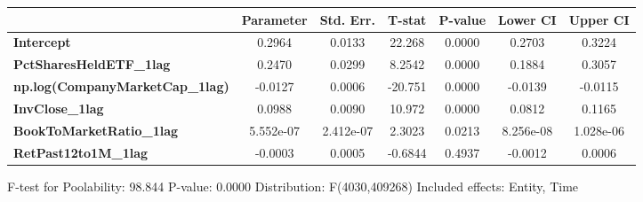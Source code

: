 \begin{center}
\begin{tabular}{lclc}
\bottomrule
\end{tabular}
\begin{tabular}{lcccccc}
                                        & \textbf{Parameter} & \textbf{Std. Err.} & \textbf{T-stat} & \textbf{P-value} & \textbf{Lower CI} & \textbf{Upper CI}  \\
\midrule
\textbf{Intercept}                      &       0.2964       &       0.0133       &      22.268     &      0.0000      &       0.2703      &       0.3224       \\
\textbf{PctSharesHeldETF\_1lag}         &       0.2470       &       0.0299       &      8.2542     &      0.0000      &       0.1884      &       0.3057       \\
\textbf{np.log(CompanyMarketCap\_1lag)} &      -0.0127       &       0.0006       &     -20.751     &      0.0000      &      -0.0139      &      -0.0115       \\
\textbf{InvClose\_1lag}                 &       0.0988       &       0.0090       &      10.972     &      0.0000      &       0.0812      &       0.1165       \\
\textbf{BookToMarketRatio\_1lag}        &     5.552e-07      &     2.412e-07      &      2.3023     &      0.0213      &     8.256e-08     &     1.028e-06      \\
\textbf{RetPast12to1M\_1lag}            &      -0.0003       &       0.0005       &     -0.6844     &      0.4937      &      -0.0012      &       0.0006       \\
\bottomrule
\end{tabular}
\end{center}

F-test for Poolability: 98.844 \newline
 P-value: 0.0000 \newline
 Distribution: F(4030,409268) \newline
  \newline
 Included effects: Entity, Time